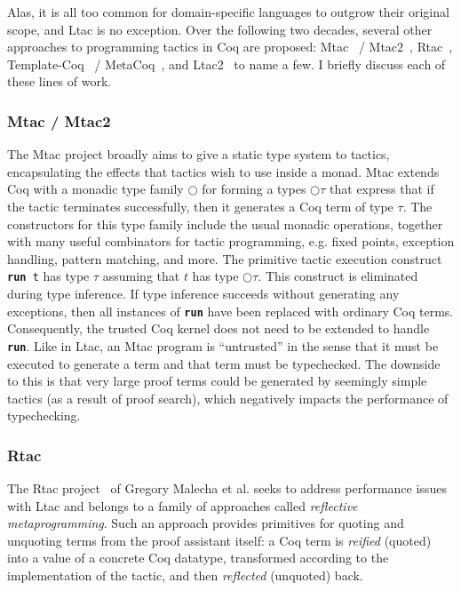 Alas, it is all too common for domain-specific languages to outgrow their
original scope, and Ltac is no exception.
Over the following two decades, several other approaches to programming
tactics in Coq are proposed:
Mtac~\cite{mtac-journal} / Mtac2~\cite{mtac2}, Rtac~\cite{rtac},
Template-Coq~\cite{template-coq} / MetaCoq~\cite{metacoq}, and
Ltac2~\cite{ltac2} to name a few.
I briefly discuss each of these lines of work.

\subsubsection{Mtac / Mtac2}

\newcommand{\trun}{{\bfseries run}}
\newcommand{\mtac}{\bigcirc}
The Mtac project broadly aims to give a static type system to tactics,
encapsulating the effects that tactics wish to use inside a monad.
Mtac extends Coq with a monadic type family $\mtac$ for forming a types $\mtac
\tau$ that express that if the tactic terminates successfully, then it generates
a Coq term of type $\tau$.
The constructors for this type family include the usual monadic operations,
together with many useful combinators for tactic programming, e.g. fixed points,
exception handling, pattern matching, and more.
The primitive tactic execution construct \texttt{\trun{} t} has type
$\tau$ assuming that $t$ has type $\mtac \tau$.
This construct is eliminated during type inference.
If type inference succeeds without generating any exceptions, then all instances
of \texttt{\trun} have been replaced with ordinary Coq terms.
Consequently, the trusted Coq kernel does not need to be extended to handle
\texttt{\trun}.
Like in Ltac, an Mtac program is ``untrusted'' in the sense that it must be
executed to generate a term and that term must be typechecked.
The downside to this is that very large proof terms could be generated by
seemingly simple tactics (as a result of proof search), which negatively impacts
the performance of typechecking.


\subsubsection{Rtac}

The Rtac project~\cite{rtac} of Gregory Malecha et al.
seeks to address performance issues with Ltac
and
belongs to a family of approaches called \emph{reflective metaprogramming}.
Such an approach provides primitives for quoting and unquoting terms from the
proof assistant itself: a Coq term is \emph{reified} (quoted) into a value of a
concrete Coq datatype, transformed according to the implementation of the
tactic, and then \emph{reflected} (unquoted) back.

